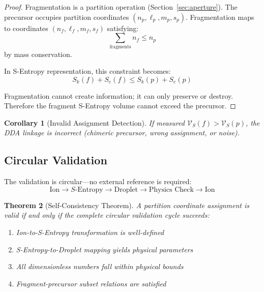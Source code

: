 \documentclass[twocolumn,10pt]{article}
\newtheorem{theorem}{Theorem}[section]
\newtheorem{corollary}[theorem]{Corollary}
\begin{document}
\begin{proof}
Fragmentation is a partition operation (Section~\ref{sec:aperture}). The precursor occupies partition coordinates $(n_p, \ell_p, m_p, s_p)$. Fragmentation maps to coordinates $(n_f, \ell_f, m_f, s_f)$ satisfying:
\begin{equation}
    \sum_{\text{fragments}} n_f \leq n_p
\end{equation}
by mass conservation.

In S-Entropy representation, this constraint becomes:
\begin{equation}
    S_k(f) + S_e(f) \leq S_k(p) + S_e(p)
\end{equation}

Fragmentation cannot create information; it can only preserve or destroy. Therefore the fragment S-Entropy volume cannot exceed the precursor.
\end{proof}

\begin{corollary}[Invalid Assignment Detection]
If measured $\mathcal{V}_S(f) > \mathcal{V}_S(p)$, the DDA linkage is incorrect (chimeric precursor, wrong assignment, or noise).
\end{corollary}

\subsection{Circular Validation}

The validation is circular---no external reference is required:
\begin{equation}
    \text{Ion} \to S\text{-Entropy} \to \text{Droplet} \to \text{Physics Check} \to \text{Ion}
\end{equation}

\begin{theorem}[Self-Consistency Theorem]
A partition coordinate assignment is valid if and only if the complete circular validation cycle succeeds:
\begin{enumerate}
    \item Ion-to-S-Entropy transformation is well-defined
    \item S-Entropy-to-Droplet mapping yields physical parameters
    \item All dimensionless numbers fall within physical bounds
    \item Fragment-precursor subset relations are satisfied
\end{enumerate}
\end{theorem}
\end{document}
